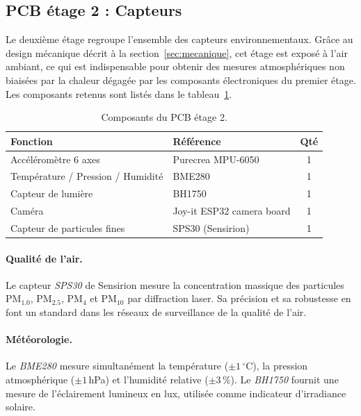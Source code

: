 \subsection{PCB étage 2 : Capteurs}\label{subsec:pcb2}

Le deuxième étage regroupe l'ensemble des capteurs environnementaux. Grâce au
design mécanique décrit à la section~\ref{sec:mecanique}, cet étage est exposé
à l'air ambiant, ce qui est indispensable pour obtenir des mesures atmosphériques
non biaisées par la chaleur dégagée par les composants électroniques du premier
étage. Les composants retenus sont listés dans le tableau~\ref{tab:pcb2}.

\begin{table}[H]
  \centering
  \caption{Composants du PCB étage 2.}
  \label{tab:pcb2}
  \begin{tabular}{llc}
    \toprule
    \textbf{Fonction}                    & \textbf{Référence}        & \textbf{Qté} \\
    \midrule
    Accéléromètre 6 axes                 & Purecrea MPU-6050         & 1 \\
    Température / Pression / Humidité    & BME280                    & 1 \\
    Capteur de lumière                   & BH1750                    & 1 \\
    Caméra                               & Joy-it ESP32 camera board & 1 \\
    Capteur de particules fines          & SPS30 (Sensirion)         & 1 \\
    \bottomrule
  \end{tabular}
\end{table}

\paragraph{Qualité de l'air.}
Le capteur \textit{SPS30} de Sensirion mesure la concentration massique des
particules PM$_{1.0}$, PM$_{2.5}$, PM$_4$ et PM$_{10}$ par diffraction laser.
Sa précision et sa robustesse en font un standard dans les réseaux de surveillance
de la qualité de l'air.

\paragraph{Météorologie.}
Le \textit{BME280} mesure simultanément la température ($\pm 1\,^{\circ}$C), la
pression atmosphérique ($\pm 1$\,hPa) et l'humidité relative ($\pm 3$\,\%). Le
\textit{BH1750} fournit une mesure de l'éclairement lumineux en lux, utilisée
comme indicateur d'irradiance solaire.

